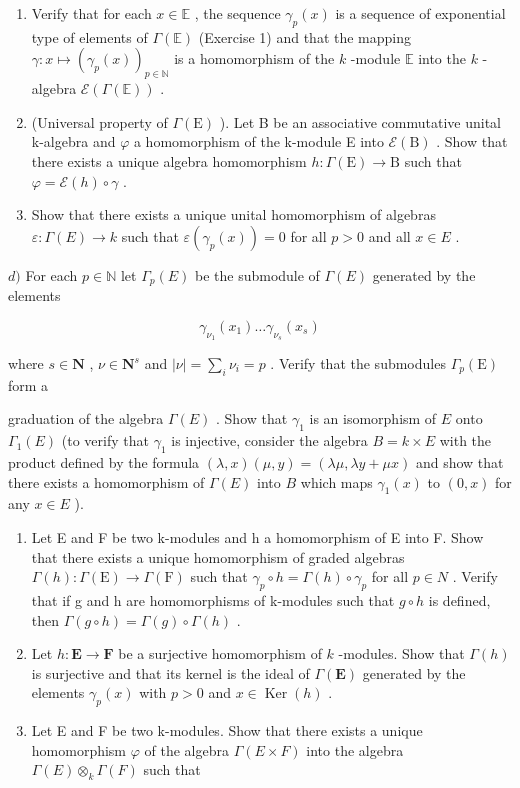 \begin{enumerate}
\def\labelenumi{\alph{enumi})}
\item
  Verify that for each \(x \in \mathbb{E}\) , the sequence \(\gamma_p(x)\) is a sequence of exponential type of elements of \(\Gamma(\mathbb{E})\) (Exercise 1) and that the mapping \(\gamma : x \mapsto (\gamma_p(x))_{p \in \mathbb{N}}\) is a homomorphism of the \(k\) -module \(\mathbb{E}\) into the \(k\) -algebra \(\mathcal{E}(\Gamma(\mathbb{E}))\) .
\item
  (Universal property of \(\Gamma(\mathrm{E})\) ). Let B be an associative commutative unital k-algebra and \(\varphi\) a homomorphism of the k-module E into \(\mathcal{E}(\mathrm{B})\) . Show that there exists a unique algebra homomorphism \(h: \Gamma(\mathrm{E}) \to \mathrm{B}\) such that \(\varphi = \mathcal{E}(h) \circ \gamma\) .
\item
  Show that there exists a unique unital homomorphism of algebras \(\varepsilon : \Gamma(E) \to k\) such that \(\varepsilon(\gamma_p(x)) = 0\) for all \(p > 0\) and all \(x \in E\) .
\end{enumerate}

\(d)\) For each \(p \in \mathbb{N}\) let \(\Gamma_p(E)\) be the submodule of \(\Gamma(E)\) generated by the elements

\[
\gamma_ {\nu_ {1}} (x _ {1}) \dots \gamma_ {\nu_ {s}} (x _ {s})
\]

where \(s \in \mathbf{N}\) , \(\nu \in \mathbf{N}^s\) and \(|\nu| = \sum_{i} \nu_i = p\) . Verify that the submodules \(\Gamma_p(\mathrm{E})\) form a

graduation of the algebra \(\Gamma(E)\) . Show that \(\gamma_{1}\) is an isomorphism of \(E\) onto \(\Gamma_{1}(E)\) (to verify that \(\gamma_{1}\) is injective, consider the algebra \(B = k \times E\) with the product defined by the formula \((\lambda, x)(\mu, y) = (\lambda \mu, \lambda y + \mu x)\) and show that there exists a homomorphism of \(\Gamma(E)\) into \(B\) which maps \(\gamma_{1}(x)\) to \((0, x)\) for any \(x \in E\) ).

\begin{enumerate}
\def\labelenumi{\alph{enumi})}
\setcounter{enumi}{4}
\item
  Let E and F be two k-modules and h a homomorphism of E into F. Show that there exists a unique homomorphism of graded algebras \(\Gamma(h):\Gamma(\mathrm{E})\to\Gamma(\mathrm{F})\) such that \(\gamma_{p}\circ h=\Gamma(h)\circ\gamma_{p}\) for all \(p\in N\) . Verify that if g and h are homomorphisms of k-modules such that \(g\circ h\) is defined, then \(\Gamma(g\circ h)=\Gamma(g)\circ\Gamma(h)\) .
\item
  Let \(h: \mathbf{E} \to \mathbf{F}\) be a surjective homomorphism of \(k\) -modules. Show that \(\Gamma(h)\) is surjective and that its kernel is the ideal of \(\Gamma(\mathbf{E})\) generated by the elements \(\gamma_p(x)\) with \(p > 0\) and \(x \in \operatorname{Ker}(h)\) .
\item
  Let E and F be two k-modules. Show that there exists a unique homomorphism \(\varphi\) of the algebra \(\Gamma(E \times F)\) into the algebra \(\Gamma(E) \otimes_{k} \Gamma(F)\) such that
\end{enumerate}

